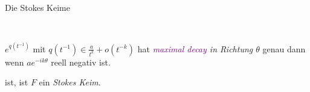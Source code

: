 \begin{frame}{Die Stokes Keime}
\begin{defn}
\begin{itemize}
\begin{enumerate}
{\begin{minipage}{\textwidth}
\begin{flushright}
              \begin{minipage}{.6\textwidth}
                ~
                \vspace{-2em}
                \begin{defn}
                  $e^{q(t^{-1})}$ mit $q(t^{-1})\in\frac{a}{t^{k}}+o(t^{-k})$
                  hat \emph{\textcolor{purple}{maximal decay} in Richtung
                    \boldmath$\theta$} genau dann wenn $ae^{-ik\theta}$ reell
                  negativ ist.
                \end{defn}
              \end{minipage}
            \end{flushright}
          \end{minipage}
        }
      \end{enumerate}
      ist, ist $F$ ein \emph{Stokes Keim}.
    \end{itemize}
  \end{defn}
\end{frame}

